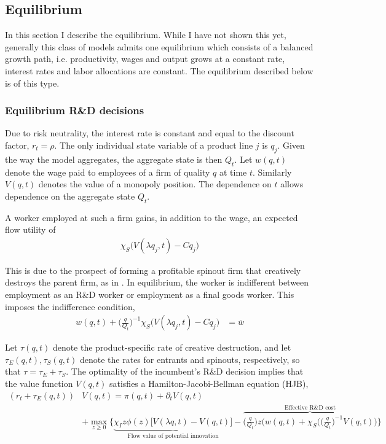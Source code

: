 \documentclass[11pt,english]{article}
\theoremstyle{remark}
\begin{document}
\subsection{Equilibrium}

In this section I describe the equilibrium. While I have not shown this yet, generally this class of models admits one equilibrium which consists of a balanced growth path, i.e. productivity, wages and output grows at a constant rate, interest rates and labor allocations are constant. The equilibrium described below is of this type. 





\subsubsection{Equilibrium R\&D decisions}

Due to risk neutrality, the interest rate is constant and equal to the discount factor, $r_t = \rho$. The only individual state variable of a product line $j$ is $q_j$. Given the way the model aggregates, the aggregate state is then $Q_t$. Let $w(q,t)$ denote the wage paid to employees of a firm of quality $q$ at time $t$. Similarly $V(q,t)$ denotes the value of a monopoly position. The dependence on $t$ allows dependence on the aggregate state $Q_t$. 

A worker employed at such a firm gains, in addition to the wage, an expected flow utility of
\begin{align*}
\chi_S \Big(V(\lambda q_j,t) - Cq_j \Big)
\end{align*}

This is due to the prospect of forming a profitable spinout firm that creatively destroys the parent firm, as in \cite{franco_spin-outs:_2006}. In equilibrium, the worker is indifferent between employment as an R\&D worker or employment as a final goods worker. This imposes the indifference condition,
\begin{align}
w(q,t) + \Big(\frac{q}{Q_t}\Big)^{-1} \chi_S \Big(V(\lambda q_j,t) - Cq_j \Big) &= \overline{w} \label{simplified_wage_rd}
\end{align}

Let $\tau(q,t)$ denote the product-specific rate of creative destruction, and let $\tau_E(q,t),\tau_S(q,t)$ denote the rates for entrants and spinouts, respectively, so that $\tau = \tau_E + \tau_S$. The optimality of the incumbent's R\&D decision implies that the value function $V(q,t)$ satisfies a Hamilton-Jacobi-Bellman equation (HJB),
\begin{align}
(r_t + \tau_E(q,t)) &V(q,t) = \pi(q,t) + \partial_tV(q,t) \nonumber \\ 
&+ \max_{z \ge 0} \Bigg\{ \underbrace{\chi_I z\phi(z) \Big[V(\lambda q,t) - V(q,t) \Big]}_{\textrm{Flow value of potential innovation}} - \overbrace{\Big(\frac{q}{Q_t}\Big) z \Big( w(q,t) + \chi_S \Big( \Big(\frac{q}{Q_t}\Big)^{-1} V(q,t) \Big)}^{\textrm{Effective R\&D cost}} \Bigg\}
\end{align}
\end{document}
